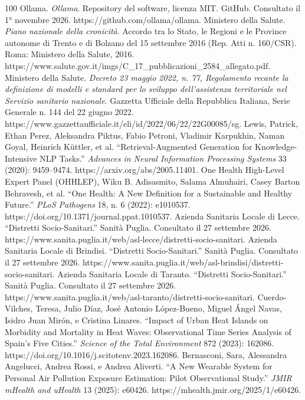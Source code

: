 \begin{thebibliography}{100}
         Ollama. \emph{Ollama}. Repository del software, licenza MIT. GitHub. Consultato il 1° novembre 2026. https://github.com/ollama/ollama.
         Ministero della Salute. \emph{Piano nazionale della cronicità}. Accordo tra lo Stato, le Regioni e le Province autonome di Trento e di Bolzano del 15 settembre 2016 (Rep. Atti n. 160/CSR). Roma: Ministero della Salute, 2016. https://www.salute.gov.it/imgs/C\_17\_pubblicazioni\_2584\_allegato.pdf.
         Ministero della Salute. \emph{Decreto 23 maggio 2022, n. 77, Regolamento recante la definizione di modelli e standard per lo sviluppo dell'assistenza territoriale nel Servizio sanitario nazionale}. Gazzetta Ufficiale della Repubblica Italiana, Serie Generale n. 144 del 22 giugno 2022. https://www.gazzettaufficiale.it/eli/id/2022/06/22/22G00085/sg.
         Lewis, Patrick, Ethan Perez, Aleksandra Piktus, Fabio Petroni, Vladimir Karpukhin, Naman Goyal, Heinrich Küttler, et al. ``Retrieval-Augmented Generation for Knowledge-Intensive NLP Tasks.'' \emph{Advances in Neural Information Processing Systems} 33 (2020): 9459--9474. https://arxiv.org/abs/2005.11401.
         One Health High-Level Expert Panel (OHHLEP), Wiku B. Adisasmito, Salama Almuhairi, Casey Barton Behravesh, et al. ``One Health: A New Definition for a Sustainable and Healthy Future.'' \emph{PLoS Pathogens} 18, n. 6 (2022): e1010537. https://doi.org/10.1371/journal.ppat.1010537.
         Azienda Sanitaria Locale di Lecce. ``Distretti Socio-Sanitari.'' Sanità Puglia. Consultato il 27 settembre 2026. https://www.sanita.puglia.it/web/asl-lecce/distretti-socio-sanitari.
         Azienda Sanitaria Locale di Brindisi. ``Distretti Socio-Sanitari.'' Sanità Puglia. Consultato il 27 settembre 2026. https://www.sanita.puglia.it/web/asl-brindisi/distretti-socio-sanitari.
         Azienda Sanitaria Locale di Taranto. ``Distretti Socio-Sanitari.'' Sanità Puglia. Consultato il 27 settembre 2026. https://www.sanita.puglia.it/web/asl-taranto/distretti-socio-sanitari.
         Cuerdo-Vilches, Teresa, Julio Díaz, José Antonio López-Bueno, Miguel Ángel Navas, Isidro Juan Mirón, e Cristina Linares. ``Impact of Urban Heat Islands on Morbidity and Mortality in Heat Waves: Observational Time Series Analysis of Spain's Five Cities.'' \emph{Science of the Total Environment} 872 (2023): 162086. https://doi.org/10.1016/j.scitotenv.2023.162086.
         Bernasconi, Sara, Alessandra Angelucci, Andrea Rossi, e Andrea Aliverti. ``A New Wearable System for Personal Air Pollution Exposure Estimation: Pilot Observational Study.'' \emph{JMIR mHealth and uHealth} 13 (2025): e60426. https://mhealth.jmir.org/2025/1/e60426.

\end{thebibliography}

